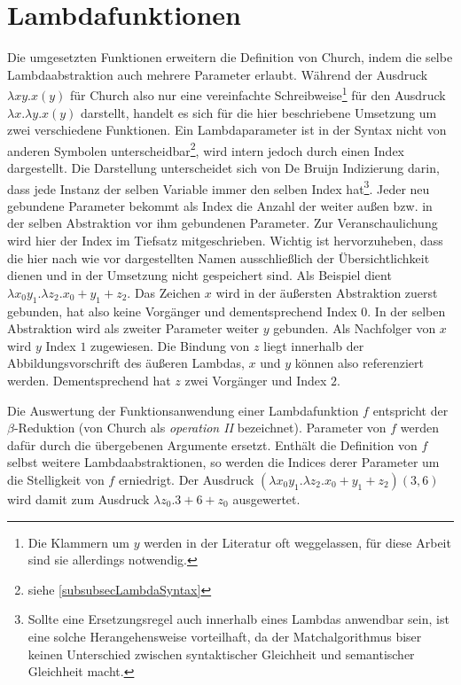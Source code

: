 \section{Lambdafunktionen} \label{subsecLambdafunktionen}
Die umgesetzten Funktionen erweitern die Definition von Church, indem die selbe Lambdaabstraktion auch mehrere Parameter erlaubt. Während der Ausdruck $\lambda x y . x(y)$ für Church also nur eine vereinfachte Schreibweise\footnote{Die Klammern um $y$ werden in der Literatur oft weggelassen, für diese Arbeit sind sie allerdings notwendig.} für den Ausdruck $\lambda x .\lambda y .x(y)$ darstellt, handelt es sich für die hier beschriebene Umsetzung um zwei verschiedene Funktionen. 
Ein Lambdaparameter ist in der Syntax nicht von anderen Symbolen unterscheidbar\footnote{siehe \ref{subsubsecLambdaSyntax}}, wird intern jedoch durch einen Index dargestellt. Die Darstellung unterscheidet sich von De Bruijn Indizierung \cite{deBruijn} darin, dass jede Instanz der selben Variable immer den selben Index hat\footnote{Sollte eine Ersetzungsregel auch innerhalb eines Lambdas anwendbar sein, ist eine solche Herangehensweise vorteilhaft, da der Matchalgorithmus biser keinen Unterschied zwischen syntaktischer Gleichheit und semantischer Gleichheit macht.}.
 Jeder neu gebundene Parameter bekommt als Index die Anzahl der weiter außen bzw. in der selben Abstraktion vor ihm gebundenen Parameter. Zur Veranschaulichung wird hier der Index im Tiefsatz mitgeschrieben. Wichtig ist hervorzuheben, dass die hier nach wie vor dargestellten Namen ausschließlich der Übersichtlichkeit dienen und in der Umsetzung nicht gespeichert sind.
 Als Beispiel dient $\lambda x_0 y_1 .\lambda z_2 .x_0 + y_1 + z_2$. Das Zeichen $x$ wird in der äußersten Abstraktion zuerst gebunden, hat also keine Vorgänger und dementsprechend Index $0$. In der selben Abstraktion wird als zweiter Parameter weiter $y$ gebunden. Als Nachfolger von $x$ wird $y$ Index $1$ zugewiesen. Die Bindung von $z$ liegt innerhalb der Abbildungsvorschrift des äußeren Lambdas, $x$ und $y$ können also referenziert werden. Dementsprechend hat $z$ zwei Vorgänger und Index $2$. 
 
 Die Auswertung der Funktionsanwendung einer Lambdafunktion $f$ entspricht der $\beta$-Reduktion (von Church \cite{ChurchLambda36} als \textit{operation II} bezeichnet). Parameter von $f$ werden dafür durch die übergebenen Argumente ersetzt. Enthält die Definition von $f$ selbst weitere Lambdaabstraktionen, so werden die Indices derer Parameter um die Stelligkeit von $f$ erniedrigt.
 Der Ausdruck $(\lambda x_0 y_1 .\lambda z_2 .x_0 + y_1 + z_2)(3, 6)$ wird damit zum Ausdruck $\lambda z_0 .3 + 6 + z_0$ ausgewertet.
 
